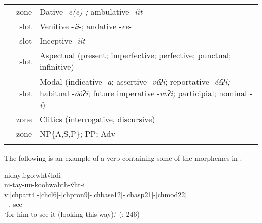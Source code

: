 \documentclass[output=paper]{langscibook}
\begin{document}
\begin{table}[htp]
\begin{tabular}{Srp{9cm}}
\label{chdat18} & zone & Dative -\textit{e(e)-;} ambulative -\textit{iit}{}-\\
\label{chven19} & slot & Venitive -\textit{ii}{}-; andative -\textit{ee}{}-\\
\label{chinc20} & slot & Inceptive -\textit{iit-}\\
\label{chasp21} & slot & Aspectual (present; imperfective; perfective; punctual; infinitive)\\
\label{chmod22} & slot & Modal (indicative -\textit{a}; assertive -\textit{v\'{v}ʔi}; reportative -\textit{ééʔi;} habitual -\textit{óóʔi}; future imperative -\textit{vvʔi;} participial; nominal -\textit{i})\\
\label{chclit23} & zone & Clitics (interrogative, discursive)\\
\label{chnp24} & zone & NP\{A,S,P\}; PP; Adv\\
\lspbottomrule
\end{tabular}
\end{table}

The following is an example of a verb containing some of the morphemes in :

\ea\label{ex:cher:key:3} {nidayú:go:whtv́hdi} \\
\glll ni-tay-uu-koohwahth-v́ht-i \\ 
 v:\ref{chpart4}-\ref{chcl6}-\ref{chpron9}-\ref{chbase12}-\ref{chasp21}-\ref{chmod22} \\
\Part{}-\Cisl{}-\Third\Sg.\Barg{}-see-\Inf{}-\Nom{}\\ 
\glt `for him to see it (looking this way).' (\citealt{PulteFeeling1975}: 246) 
\z 
\end{document}
